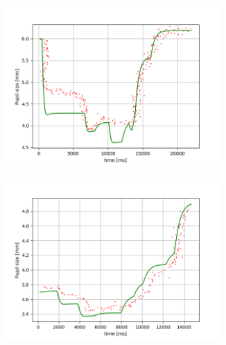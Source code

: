 \documentclass[USenglish,twocolumn]{article}
\begin{document}
\begin{figure}[H]
	\captionsetup[subfigure]{justification=centering}
	\centering
	\begin{subfigure}[b]{0.45\textwidth}
		\centering
		\includegraphics[width=0.9\textwidth]{img/Experiment/DarkTunnel.png}
		\caption{}
		\label{fig:experiment1}
	\end{subfigure}

	\begin{subfigure}[b]{0.45\textwidth}
		\centering
		\includegraphics[width=0.9\textwidth]{img/Experiment/SmallChanges.png}
		\caption{}
		\label{fig:experiment2}
	\end{subfigure}


\end{figure}
\end{document}
